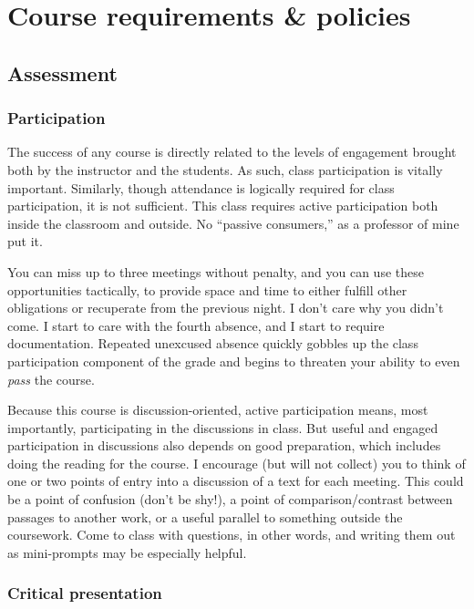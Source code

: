 \chapter{Course requirements \& policies}
\label{courserequirementspolicies}

\section{Assessment}
\label{assessment}

\subsection{Participation}
\label{participation}

The success of any course is directly related to the levels of engagement
brought both by the instructor and the students. As such, class participation
is vitally important. Similarly, though attendance is logically required for
class participation, it is not sufficient. This class requires active
participation both inside the classroom and outside. No “passive consumers,” as
a professor of mine put it. 

You can miss up to three meetings without penalty, and you can use these
opportunities tactically, to provide space and time to either fulfill other
obligations or recuperate from the previous night. I don’t care why you didn’t
come. I start to care with the fourth absence, and I start to require
documentation. Repeated unexcused absence quickly gobbles up the class
participation component of the grade and begins to threaten your ability to
even \emph{pass} the course.

Because this course is discussion-oriented, active participation means, most
importantly, participating in the discussions in class. But useful and engaged
participation in discussions also depends on good preparation, which includes
doing the reading for the course. I encourage (but will not collect) you to
think of one or two points of entry into a discussion of a text for each
meeting. This could be a point of confusion (don’t be shy!), a point of
comparison\slash contrast between passages to another work, or a useful parallel to
something outside the coursework. Come to class with questions, in other words,
and writing them out as mini-prompts may be especially helpful.

\subsection{Critical presentation}
\label{criticalpresentation}

